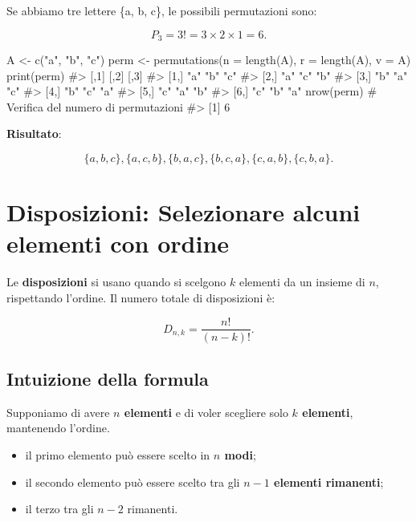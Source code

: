 \documentclass[
  italian,
  letterpaper,
  a4paper,
  11pt,
  open=any]{scrbook}
\newenvironment{Shaded}{\begin{snugshade}}{\end{snugshade}}
\newcommand{\AttributeTok}[1]{\textcolor[rgb]{0.40,0.45,0.13}{#1}}
\newcommand{\CommentTok}[1]{\textcolor[rgb]{0.37,0.37,0.37}{#1}}
\newcommand{\FunctionTok}[1]{\textcolor[rgb]{0.28,0.35,0.67}{#1}}
\newcommand{\NormalTok}[1]{\textcolor[rgb]{0.00,0.23,0.31}{#1}}
\newcommand{\OtherTok}[1]{\textcolor[rgb]{0.00,0.23,0.31}{#1}}
\newcommand{\StringTok}[1]{\textcolor[rgb]{0.13,0.47,0.30}{#1}}
\providecommand{\tightlist}{%
  \setlength{\itemsep}{0pt}\setlength{\parskip}{0pt}}
\theoremstyle{plain}
\theoremstyle{definition}
\theoremstyle{definition}
\theoremstyle{remark}
\begin{document}
Se abbiamo tre lettere \{a, b, c\}, le possibili permutazioni sono:

\[
P_3 = 3! = 3 \times 2 \times 1 = 6.
\]

\begin{Shaded}
\begin{Highlighting}[]
\NormalTok{A }\OtherTok{\textless{}{-}} \FunctionTok{c}\NormalTok{(}\StringTok{"a"}\NormalTok{, }\StringTok{"b"}\NormalTok{, }\StringTok{"c"}\NormalTok{)}
\NormalTok{perm }\OtherTok{\textless{}{-}} \FunctionTok{permutations}\NormalTok{(}\AttributeTok{n =} \FunctionTok{length}\NormalTok{(A), }\AttributeTok{r =} \FunctionTok{length}\NormalTok{(A), }\AttributeTok{v =}\NormalTok{ A)}
\FunctionTok{print}\NormalTok{(perm)}
\CommentTok{\#\textgreater{}      [,1] [,2] [,3]}
\CommentTok{\#\textgreater{} [1,] "a"  "b"  "c" }
\CommentTok{\#\textgreater{} [2,] "a"  "c"  "b" }
\CommentTok{\#\textgreater{} [3,] "b"  "a"  "c" }
\CommentTok{\#\textgreater{} [4,] "b"  "c"  "a" }
\CommentTok{\#\textgreater{} [5,] "c"  "a"  "b" }
\CommentTok{\#\textgreater{} [6,] "c"  "b"  "a"}
\FunctionTok{nrow}\NormalTok{(perm)  }\CommentTok{\# Verifica del numero di permutazioni}
\CommentTok{\#\textgreater{} [1] 6}
\end{Highlighting}
\end{Shaded}

\textbf{Risultato}:

\[
\{a, b, c\}, \{a, c, b\}, \{b, a, c\}, \{b, c, a\}, \{c, a, b\}, \{c, b, a\}.
\]

\section{Disposizioni: Selezionare alcuni elementi con
ordine}\label{disposizioni-selezionare-alcuni-elementi-con-ordine}

Le \textbf{disposizioni} si usano quando si scelgono \(k\) elementi da
un insieme di \(n\), rispettando l'ordine. Il numero totale di
disposizioni è:

\[
D_{n,k} = \frac{n!}{(n-k)!} .
\]

\subsection{Intuizione della formula}\label{intuizione-della-formula-1}

Supponiamo di avere \textbf{\(n\) elementi} e di voler scegliere solo
\textbf{\(k\) elementi}, mantenendo l'ordine.

\begin{itemize}
\tightlist
\item
  il primo elemento può essere scelto in \textbf{\(n\) modi};
\item
  il secondo elemento può essere scelto tra gli \textbf{\(n-1\) elementi
  rimanenti};\\
\item
  il terzo tra gli \textbf{\(n-2\)} rimanenti.
\end{itemize}
\end{document}

